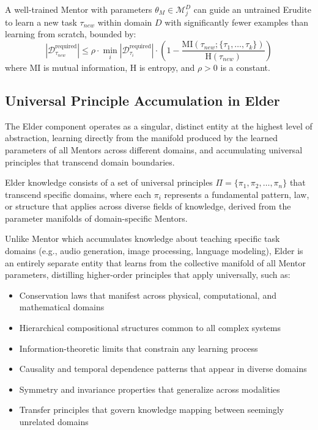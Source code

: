 \begin{theorem}
A well-trained Mentor with parameters $\theta_M \in \mathcal{M}_j^D$ can guide an untrained Erudite to learn a new task $\tau_{new}$ within domain $D$ with significantly fewer examples than learning from scratch, bounded by:
\begin{equation}
|\mathcal{D}_{\tau_{new}}^{\text{required}}| \leq \rho \cdot \min_i |\mathcal{D}_{\tau_i}^{\text{required}}| \cdot \left(1 - \frac{\text{MI}(\tau_{new}; \{\tau_1,\ldots,\tau_k\})}{\text{H}(\tau_{new})}\right)
\end{equation}
where $\text{MI}$ is mutual information, $\text{H}$ is entropy, and $\rho > 0$ is a constant.
\end{theorem}

\subsection{Universal Principle Accumulation in Elder}

The Elder component operates as a singular, distinct entity at the highest level of abstraction, learning directly from the manifold produced by the learned parameters of all Mentors across different domains, and accumulating universal principles that transcend domain boundaries.

\begin{definition}
Elder knowledge consists of a set of universal principles $\Pi = \{\pi_1, \pi_2, \ldots, \pi_n\}$ that transcend specific domains, where each $\pi_i$ represents a fundamental pattern, law, or structure that applies across diverse fields of knowledge, derived from the parameter manifolds of domain-specific Mentors.
\end{definition}

Unlike Mentor which accumulates knowledge about teaching specific task domains (e.g., audio generation, image processing, language modeling), Elder is an entirely separate entity that learns from the collective manifold of all Mentor parameters, distilling higher-order principles that apply universally, such as:
\begin{itemize}
    \item Conservation laws that manifest across physical, computational, and mathematical domains
    \item Hierarchical compositional structures common to all complex systems
    \item Information-theoretic limits that constrain any learning process
    \item Causality and temporal dependence patterns that appear in diverse domains
    \item Symmetry and invariance properties that generalize across modalities
    \item Transfer principles that govern knowledge mapping between seemingly unrelated domains
\end{itemize}

